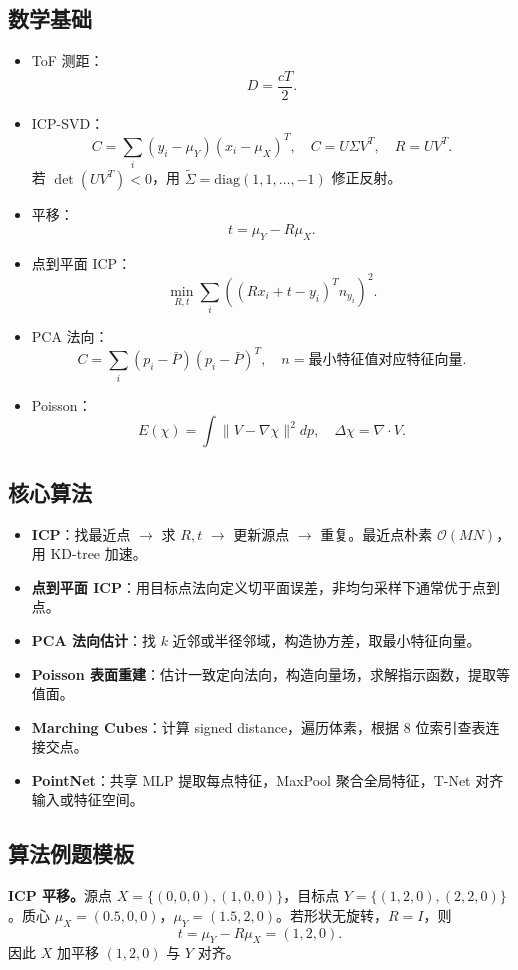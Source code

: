 \documentclass[UTF8,zihao=-4,scheme=chinese,fontset=fandol]{ctexart}
\newcommand{\key}[1]{\textbf{#1}}
\begin{document}
\subsection{数学基础}
\begin{itemize}
  \item ToF 测距：
  \[
  D=\frac{cT}{2}.
  \]
  \item ICP-SVD：
  \[
  C=\sum_i(y_i-\mu_Y)(x_i-\mu_X)^T,\quad C=U\Sigma V^T,\quad R=UV^T.
  \]
  若 $\det(UV^T)<0$，用 $\tilde\Sigma=\mathrm{diag}(1,1,\ldots,-1)$ 修正反射。
  \item 平移：
  \[
  t=\mu_Y-R\mu_X.
  \]
  \item 点到平面 ICP：
  \[
  \min_{R,t}\sum_i((Rx_i+t-y_i)^Tn_{y_i})^2.
  \]
  \item PCA 法向：
  \[
  C=\sum_i(p_i-\bar P)(p_i-\bar P)^T,\quad n=\text{最小特征值对应特征向量}.
  \]
  \item Poisson：
  \[
  E(\chi)=\int\|V-\nabla\chi\|^2dp,\quad \Delta\chi=\nabla\cdot V.
  \]
\end{itemize}

\subsection{核心算法}
\begin{itemize}
  \item \key{ICP}：找最近点 $\rightarrow$ 求 $R,t$ $\rightarrow$ 更新源点 $\rightarrow$ 重复。最近点朴素 $\mathcal O(MN)$，用 KD-tree 加速。
  \item \key{点到平面 ICP}：用目标点法向定义切平面误差，非均匀采样下通常优于点到点。
  \item \key{PCA 法向估计}：找 $k$ 近邻或半径邻域，构造协方差，取最小特征向量。
  \item \key{Poisson 表面重建}：估计一致定向法向，构造向量场，求解指示函数，提取等值面。
  \item \key{Marching Cubes}：计算 signed distance，遍历体素，根据 8 位索引查表连接交点。
  \item \key{PointNet}：共享 MLP 提取每点特征，MaxPool 聚合全局特征，T-Net 对齐输入或特征空间。
\end{itemize}

\subsection{算法例题模板}
\textbf{ICP 平移。}源点 $X=\{(0,0,0),(1,0,0)\}$，目标点 $Y=\{(1,2,0),(2,2,0)\}$。质心 $\mu_X=(0.5,0,0)$，$\mu_Y=(1.5,2,0)$。若形状无旋转，$R=I$，则
\[
t=\mu_Y-R\mu_X=(1,2,0).
\]
因此 $X$ 加平移 $(1,2,0)$ 与 $Y$ 对齐。
\end{document}
